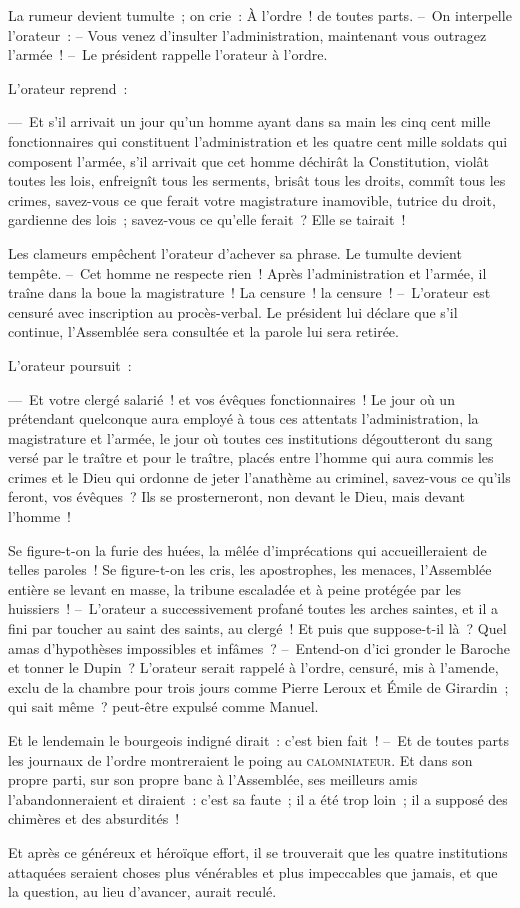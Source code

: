 \documentclass[french,twoside]{book} %
\begin{document}
La rumeur devient tumulte ; on crie : À l’ordre ! de toutes parts. – On interpelle l’orateur : – Vous venez d’insulter l’administration, maintenant vous outragez l’armée ! – Le président rappelle l’orateur à l’ordre.\par
L’orateur reprend :\par
— Et s’il arrivait un jour qu’un homme ayant dans sa main les cinq cent mille fonctionnaires qui constituent l’administration et les quatre cent mille soldats qui composent l’armée, s’il arrivait que cet homme déchirât la Constitution, violât toutes les lois, enfreignît tous les serments, brisât tous les droits, commît tous les crimes, savez-vous ce que ferait votre magistrature inamovible, tutrice du droit, gardienne des lois ; savez-vous ce qu’elle ferait ? Elle se tairait !\par
Les clameurs empêchent l’orateur d’achever sa phrase. Le tumulte devient tempête. – Cet homme ne respecte rien ! Après l’administration et l’armée, il traîne dans la boue la magistrature ! La censure ! la censure ! – L’orateur est censuré avec inscription au procès-verbal. Le président lui déclare que s’il continue, l’Assemblée sera consultée et la parole lui sera retirée.\par
L’orateur poursuit :\par
— Et votre clergé salarié ! et vos évêques fonctionnaires ! Le jour où un prétendant quelconque aura employé à tous ces attentats l’administration, la magistrature et l’armée, le jour où toutes ces institutions dégoutteront du sang versé par le traître et pour le traître, placés entre l’homme qui aura commis les crimes et le Dieu qui ordonne de jeter l’anathème au criminel, savez-vous ce qu’ils feront, vos évêques ? Ils se prosterneront, non devant le Dieu, mais devant l’homme !\par
Se figure-t-on la furie des huées, la mêlée d’imprécations qui accueilleraient de telles paroles ! Se figure-t-on les cris, les apostrophes, les menaces, l’Assemblée entière se levant en masse, la tribune escaladée et à peine protégée par les huissiers ! – L’orateur a successivement profané toutes les arches saintes, et il a fini par toucher au saint des saints, au clergé ! Et puis que suppose-t-il là ? Quel amas d’hypothèses impossibles et infâmes ? – Entend-on d’ici gronder le Baroche et tonner le Dupin ? L’orateur serait rappelé à l’ordre, censuré, mis à l’amende, exclu de la chambre pour trois jours comme Pierre Leroux et Émile de Girardin ; qui sait même ? peut-être expulsé comme Manuel.\par
Et le lendemain le bourgeois indigné dirait : c’est bien fait ! – Et de toutes parts les journaux de l’ordre montreraient le poing au {\scshape calomniateur}. Et dans son propre parti, sur son propre banc à l’Assemblée, ses meilleurs amis l’abandonneraient et diraient : c’est sa faute ; il a été trop loin ; il a supposé des chimères et des absurdités !\par
Et après ce généreux et héroïque effort, il se trouverait que les quatre institutions attaquées seraient choses plus vénérables et plus impeccables que jamais, et que la question, au lieu d’avancer, aurait reculé.
\end{document}
